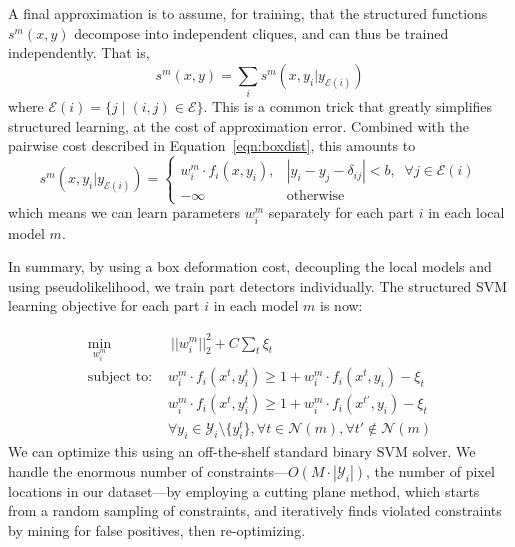  A final approximation is to assume, for training, that the structured functions $s^m(x,y)$ decompose into independent cliques, and can thus be trained independently.  That is,
$$ s^m(x,y) = \sum_{i} s^m(x,y_i | y_{\mathcal{E}(i)}) $$ 
where $\mathcal{E}(i) = \{j \;|\; (i,j) \in \mathcal{E}\}$.  This is a common trick that greatly simplifies structured learning, at the cost of approximation error. 
Combined with the pairwise cost described in Equation~\ref{eqn:boxdist}, this amounts to
$$s^m(x,y_i| y_{\mathcal{E}(i)}) = 
\begin{cases}
 w^m_i \cdot f_i(x,y_i), & |y_i - y_j - \delta_{ij}| < b,\;\; \forall j \in \mathcal{E}(i) \\
 -\infty & \text{otherwise}
\end{cases}
$$
which means we can learn parameters $w_i^m$ separately for each part $i$ in 
each local model $m$.

In summary, by using a box deformation cost, decoupling the local models and using pseudolikelihood, we train part detectors individually.  The structured SVM learning objective for each part $i$ in each model $m$ is now:

\begin{align}
\min_{w_i^m}&~||w_i^m||_2^2 + C \sum_{t} \xi_t\\
\text{subject to: }
& w_i^m \cdot f_i(x^t,y_i^t) \geq 1+w_i^m \cdot f_i(x^t,y_i)-\xi_t \nonumber \\
& w_i^m \cdot f_i(x^t,y_i^t) \geq 1+w_i^m \cdot f_i(x^{t'},y_i)-\xi_t \nonumber 
\\
&\forall y_i \in \mathcal{Y}_i\setminus \{y_i^t\}, \forall t \in 
\mathcal{N}(m), \forall t' \notin \mathcal{N}(m) \nonumber
\end{align}
We can optimize this using an off-the-shelf standard binary SVM solver.  We 
handle the enormous number of constraints---$O(M \cdot |\mathcal{Y}_i|)$, the 
number of pixel locations in our dataset---by employing a cutting plane method, 
which starts from a random sampling of constraints, and iteratively finds 
violated constraints by mining for false positives, then re-optimizing.

	
